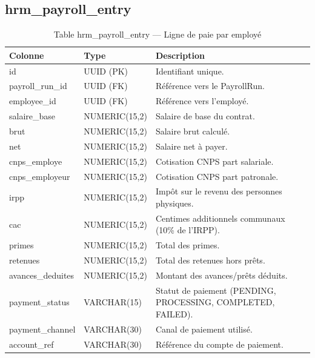 \documentclass[a4paper,12pt,openany]{book}
\begin{document}
    \subsection{hrm\_payroll\_entry}
    \begin{table}[H]
        \centering
        \caption{Table hrm\_payroll\_entry — Ligne de paie par employé}
        \begin{tabularx}{\textwidth}{llX}
    \toprule
    \textbf{Colonne} & \textbf{Type} & \textbf{Description} \\
    \midrule
    id               & UUID (PK)       & Identifiant unique. \\
    payroll\_run\_id & UUID (FK)       & Référence vers le PayrollRun. \\
    employee\_id     & UUID (FK)       & Référence vers l'employé. \\
    salaire\_base    & NUMERIC(15,2)   & Salaire de base du contrat. \\
    brut             & NUMERIC(15,2)   & Salaire brut calculé. \\
    net              & NUMERIC(15,2)   & Salaire net à payer. \\
    cnps\_employe    & NUMERIC(15,2)   & Cotisation CNPS part salariale. \\
    cnps\_employeur  & NUMERIC(15,2)   & Cotisation CNPS part patronale. \\
    irpp             & NUMERIC(15,2)   & Impôt sur le revenu des personnes physiques. \\
    cac              & NUMERIC(15,2)   & Centimes additionnels communaux (10\% de l'IRPP). \\
    primes           & NUMERIC(15,2)   & Total des primes. \\
    retenues         & NUMERIC(15,2)   & Total des retenues hors prêts. \\
    avances\_deduites & NUMERIC(15,2)  & Montant des avances/prêts déduits. \\
    payment\_status  & VARCHAR(15)     & Statut de paiement (PENDING, PROCESSING, COMPLETED, FAILED). \\
    payment\_channel & VARCHAR(30)     & Canal de paiement utilisé. \\
    account\_ref     & VARCHAR(30)     & Référence du compte de paiement. \\
    \bottomrule
        \end{tabularx}
    \end{table}
\end{document}
